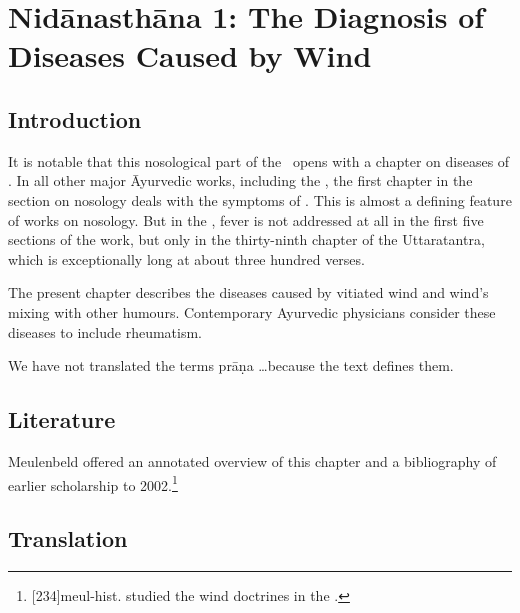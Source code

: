 
\chapter{Nidānasthāna 1: The Diagnosis of Diseases Caused by Wind}


\section{Introduction}

It is notable that this nosological part of the \SS\ opens with a chapter on
diseases of .  In all other major Āyurvedic works, including the
\CS, the first chapter in the section on nosology deals with the symptoms of
.  This is almost a defining feature of works on nosology.  But
in the \SS, fever is not addressed at all in the first five sections of the
work, but only in the thirty-ninth chapter of the Uttaratantra, which is
exceptionally long at about three hundred verses.

The present chapter describes the diseases caused by vitiated wind and wind's
mixing with other humours. Contemporary Ayurvedic physicians consider these
diseases to include rheumatism. 

We have not translated the terms prāṇa \ldots because the text defines
them.

\section{Literature}

Meulenbeld offered an annotated overview of this chapter and a bibliography of
earlier scholarship to 2002.\footnote{[234]{meul-hist}.
\citep{rube-1954b} studied the wind doctrines in the \CS.}



\section{Translation}


